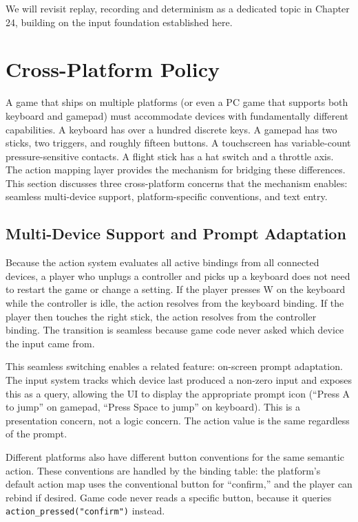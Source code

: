 \documentclass[
  11pt,
  letterpaper,
  DIV=11,
  numbers=noendperiod,
  twoside,
  open=right]{scrreprt}
\begin{document}
We will revisit replay, recording and determinism as a dedicated topic
in Chapter 24, building on the input foundation established here.

\section{Cross-Platform Policy}\label{sec-cross-platform}

A game that ships on multiple platforms (or even a PC game that supports
both keyboard and gamepad) must accommodate devices with fundamentally
different capabilities. A keyboard has over a hundred discrete keys. A
gamepad has two sticks, two triggers, and roughly fifteen buttons. A
touchscreen has variable-count pressure-sensitive contacts. A flight
stick has a hat switch and a throttle axis. The action mapping layer
provides the mechanism for bridging these differences. This section
discusses three cross-platform concerns that the mechanism enables:
seamless multi-device support, platform-specific conventions, and text
entry.

\subsection{Multi-Device Support and Prompt
Adaptation}\label{multi-device-support-and-prompt-adaptation}

Because the action system evaluates all active bindings from all
connected devices, a player who unplugs a controller and picks up a
keyboard does not need to restart the game or change a setting. If the
player presses W on the keyboard while the controller is idle, the
action resolves from the keyboard binding. If the player then touches
the right stick, the action resolves from the controller binding. The
transition is seamless because game code never asked which device the
input came from.

This seamless switching enables a related feature: on-screen prompt
adaptation. The input system tracks which device last produced a
non-zero input and exposes this as a query, allowing the UI to display
the appropriate prompt icon (``Press A to jump'' on gamepad, ``Press
Space to jump'' on keyboard). This is a presentation concern, not a
logic concern. The action value is the same regardless of the prompt.

Different platforms also have different button conventions for the same
semantic action. These conventions are handled by the binding table: the
platform's default action map uses the conventional button for
``confirm,'' and the player can rebind if desired. Game code never reads
a specific button, because it queries
\texttt{action\_pressed("confirm")} instead.
\end{document}
